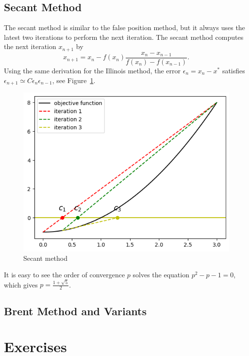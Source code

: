 \subsection{Secant Method}
\label{SSec: 0-SE-ME}
The secant method is similar to the false position method, but it always uses the latest two iterations to perform the next iteration. The secant method computes the next iteration $x_{n+1}$ by
$$
x_{n+1} = x_n - f(x_n)\frac{x_n - x_{n-1}}{f(x_n) - f(x_{n-1})}.
$$
Using the same derivation for the Illinois method, the error $\epsilon_{n} = x_n - x^{\ast}$ satisfies $\epsilon_{n+1} \simeq C \epsilon_{n}\epsilon_{n-1}$, see Figure~\ref{FIG: 0-RO-FI-SE}.
\begin{figure}[!htb]
    \centering
    \includegraphics[scale=0.6]{Figures/root_finding_img_3.png}
    \caption{Secant method}
    \label{FIG: 0-RO-FI-SE}
\end{figure}
It is easy to see the order of convergence $p$ solves the equation $p^2 - p - 1 = 0$, which gives $p = \frac{1 + \sqrt{5}}{2}$.
\subsection{Brent Method and Variants}


\section{Exercises}
